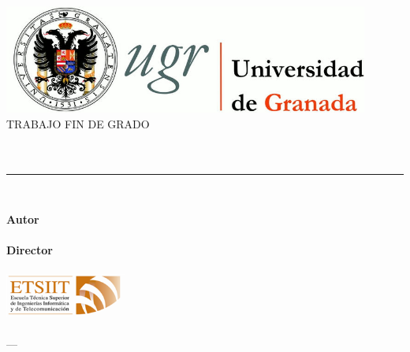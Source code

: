 \begin{titlepage}

\newlength{\centeroffset}
\setlength{\centeroffset}{-0.5\oddsidemargin}
\addtolength{\centeroffset}{0.5\evensidemargin}
\thispagestyle{empty}

\noindent\hspace*{\centeroffset}\begin{minipage}{\textwidth}

\centering
\includegraphics[width=0.9\textwidth]{imagenes/logo_ugr.jpg}\\[1.4cm]

\textsc{ \Large TRABAJO FIN DE GRADO\\[0.2cm]}
\textsc{ \myDegree }\\[1cm]
% 
{\Large \bfseries{ \myTitle }\\ }
\noindent\rule[-1ex]{\textwidth}{3pt}\\[3.5ex]
{\large\bfseries}
\end{minipage}

\vspace{2.5cm}
\noindent\hspace*{\centeroffset}\begin{minipage}{\textwidth}
\centering

\textbf{Autor}\\ {\myName}\\[2.5ex]
\textbf{Director}\\
{\myProf}\\[2cm]
\includegraphics[width=0.3\textwidth]{imagenes/etsiit_logo.png}\\[0.1cm]
\textsc{ \myFaculty }\\
\textsc{---}\\
\myTime
\end{minipage}
\end{titlepage}


